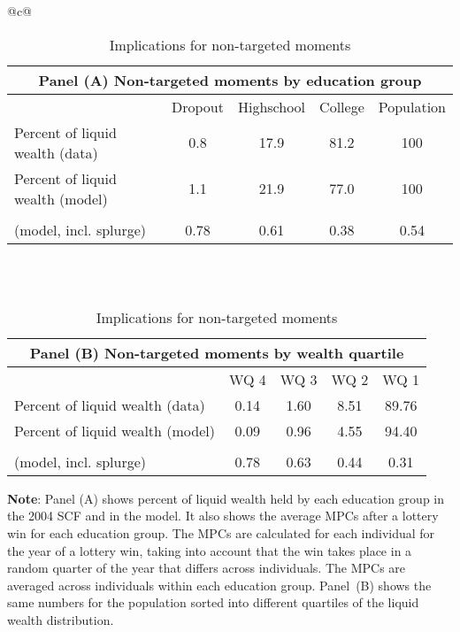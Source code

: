 \documentclass[\econtexRoot/HAFiscal]{subfiles}
\begin{document}
\begin{table}[th]
    \centering
    \begin{tabular*}{\textwidth}{@{\extracolsep{\fill}}c@{}}
        \begin{tabular}{lcccc}
            \multicolumn{5}{c}{Panel (A) Non-targeted moments by education group} \\ \midrule
            & Dropout & Highschool & College & Population \\ \midrule
            Percent of liquid wealth (data) & 0.8 & 17.9 & 81.2 & 100 \\
            Percent of liquid wealth (model) & 1.1 & 21.9 & 77.0 & 100 \\
            \makecell[l]{Avg. lottery-win-year MPC \\ (model, incl. splurge)} & 0.78 & 0.61 & 0.38 & 0.54
            \\ \bottomrule 
        \end{tabular} \\ \\

      \vspace{2em}
      
        \begin{tabular}{lcccc}
            \multicolumn{5}{c}{Panel (B) Non-targeted moments by wealth quartile} \\ \midrule
             & WQ 4 & WQ 3 & WQ 2 & WQ 1 \\ \midrule
            Percent of liquid wealth (data) & 0.14 & 1.60 & 8.51 & 89.76 \\
            Percent of liquid wealth (model) & 0.09 & 0.96 & 4.55 & 94.40 \\
            \makecell[l]{Avg. lottery-win-year MPC \\ (model, incl. splurge)} & 0.78 & 0.63 & 0.44 & 0.31
            \\ \bottomrule 
        \end{tabular}
    \end{tabular*}
    \caption{Implications for non-targeted moments}
    \notinsubfile{\label{tab:nonTargetedMoments}}
    \parbox{16cm}{\small \vspace{.15cm} \textbf{Note}: Panel (A) shows percent of liquid wealth held by each education group in the 2004 SCF and in the model.
It also shows the average MPCs after a lottery win for each education group.
The MPCs are calculated for each individual for the year of a lottery win, taking into account that the win takes place in a random quarter of the year that differs across individuals.
The MPCs are averaged across individuals within each education group.
Panel~(B) shows the same numbers for the population sorted into different quartiles of the liquid wealth distribution.\normalsize}
  \end{table}
  
\end{document}
